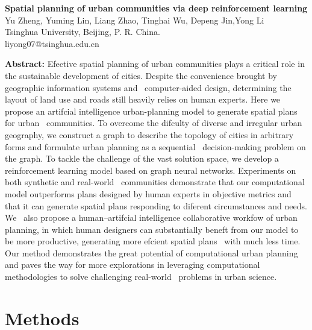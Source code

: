 \tnr

\begin{center}
    \textbf{Spatial planning of urban communities via deep reinforcement learning}\\    
    \zuozhe Yu Zheng, Yuming Lin, Liang Zhao, Tinghai Wu, Depeng Jin,Yong Li\\
    \xuexiao Tsinghua University, Beijing, P. R. China.\\
    liyong07@tsinghua.edu.cn\\
\end{center}

\fontsize{10.5pt}{10.5pt}\selectfont

\noindent\textbf{Abstract: }Efective spatial planning of urban communities plays a critical role in the sustainable development of cities. Despite the convenience brought by geographic information systems and \
computer-aided design, determining the layout of land use and roads still heavily relies on human experts. Here we propose an artifcial intelligence urban-planning model to generate spatial plans for urban \
communities. To overcome the difculty of diverse and irregular urban geography, we construct a graph to describe the topology of cities in arbitrary forms and formulate urban planning as a sequential \
decision-making problem on the graph. To tackle the challenge of the vast solution space, we develop a reinforcement learning model based on graph neural networks. Experiments on both synthetic and real-world \
communities demonstrate that our computational model outperforms plans designed by human experts in objective metrics and that it can generate spatial plans responding to diferent circumstances and needs. We \
also propose a human–artifcial intelligence collaborative workfow of urban planning, in which human designers can substantially beneft from our model to be more productive, generating more efcient spatial plans \
with much less time. Our method demonstrates the great potential of computational urban planning and paves the way for more explorations in leveraging computational methodologies to solve challenging real-world \
problems in urban science.

\section{Methods}
